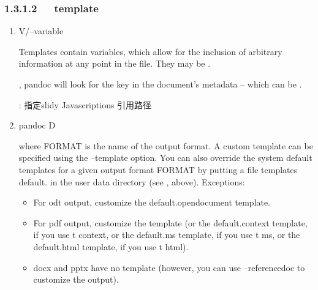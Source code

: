 \documentclass[letterpaper,12pt,english]{sphinxmanual}
\begin{document}
\subsubsection{1.3.1.2   template}
\label{\detokenize{001software/001install/pandoc:template}}\begin{enumerate}
%
\item {} 
\sphinxhyphen{}V/–variable

Templates contain variables, which allow for the inclusion of
arbitrary information at any point in the file. They may be .

, pandoc will look for the key in the
document’s metadata – which can be .

 : 指定slidy Javascriptions 引用路径

\item {} 
pandoc \sphinxhyphen{}D 

where FORMAT is the name of the output format. A custom template can
be specified using the –template option. You can also override the
system default templates for a given output format FORMAT by putting
a file templates default. in the user data directory (see
, above). Exceptions:
\begin{itemize}
\item {} 
For odt output, customize the default.opendocument template.

\item {} 
For pdf output, customize the  template (or the
default.context template, if you use \sphinxhyphen{}t context, or the default.ms
template, if you use \sphinxhyphen{}t ms, or the default.html template, if you
use \sphinxhyphen{}t html).

\item {} 
docx and pptx have no template (however, you can use
–reference\sphinxhyphen{}doc to customize the output).

\begin{sphinxVerbatim}[commandchars=\\\{\}]
  \PYGZbs{}\PYGZbs{}    \PYGZbs{}\PYGZbs{}
  \PYGZbs{}\PYGZbs{}    \PYGZbs{}
\end{sphinxVerbatim}


\end{itemize}
\end{enumerate}
\end{document}

